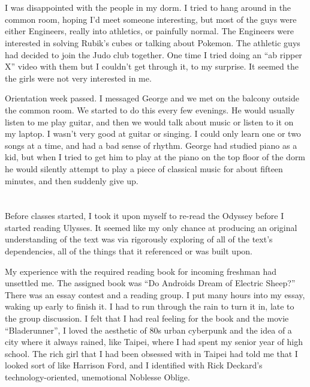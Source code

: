 \section{}

I was disappointed with the people in my dorm.  I tried to hang around in the
common room, hoping I'd meet someone interesting, but most of the guys were
either Engineers, really into athletics, or painfully normal.  The Engineers
were interested in solving Rubik's cubes or talking about Pokemon.  The athletic
guys had decided to join the Judo club together.  One time I tried doing an ``ab
ripper X'' video with them but I couldn't get through it, to my surprise.  It
seemed the the girls were not very interested in me.

Orientation week passed.  I messaged George and we met on the balcony outside
the common room.  We started to do this every few evenings.  He would usually
listen to me play guitar, and then we would talk about music or listen to it on
my laptop.  I wasn't very good at guitar or singing.  I could only learn one or
two songs at a time, and had a bad sense of rhythm.  George had studied piano as
a kid, but when I tried to get him to play at the piano on the top floor of the
dorm he would silently attempt to play a piece of classical music for about
fifteen minutes, and then suddenly give up.  

\section{}

Before classes started, I took it upon myself to re-read the Odyssey before I
started reading Ulysses.  It seemed like my only chance at producing an original
understanding of the text was via rigorously exploring of all of the text's
dependencies, all of the things that it referenced or was built upon. 

My experience with the required reading book for incoming freshman had unsettled
me.  The assigned book was ``Do Androids Dream of Electric Sheep?''  There was
an essay contest and a reading group.  I put many hours into my essay, waking up
early to finish it.  I  had to run through the rain to turn it in, late to the
group discussion.  I felt that I had real feeling for the book and the movie
``Bladerunner'', I loved the aesthetic of 80s urban cyberpunk and the idea of a
city where it always rained, like Taipei, where I had spent my senior year of
high school.  The rich girl that I had been obsessed with in Taipei had told me
that I looked sort of like Harrison Ford, and I identified with Rick Deckard's
technology-oriented, unemotional Noblesse Oblige. 

